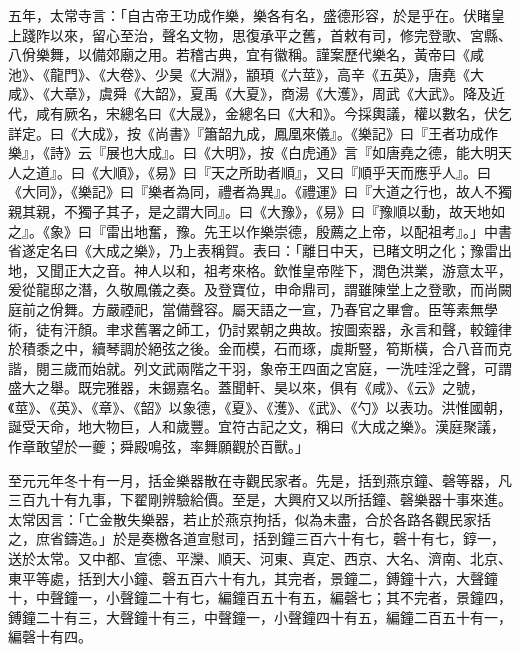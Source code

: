 \begin{pinyinscope}
 五年，太常寺言：「自古帝王功成作樂，樂各有名，盛德形容，於是乎在。伏睹皇上踐阼以來，留心至治，聲名文物，思復承平之舊，首敕有司，修完登歌、宮縣、八佾樂舞，以備郊廟之用。若稽古典，宜有徽稱。謹案歷代樂名，黃帝曰《咸池》、《龍門》、《大卷》、少昊《大淵》，顓頊《六莖》，高辛《五英》，唐堯《大咸》、《大章》，虞舜《大韶》，夏禹《大夏》，商湯《大濩》，周武《大武》。降及近代，咸有厥名，宋總名曰《大晟》，金總名曰《大和》。今採輿議，權以數名，伏乞詳定。曰《大成》，按《尚書》『簫韶九成，鳳凰來儀』。《樂記》曰『王者功成作樂』，《詩》云『展也大成』。曰《大明》，按《白虎通》言『如唐堯之德，能大明天人之道』。曰《大順》，《易》曰『天之所助者順』，又曰『順乎天而應乎人』。曰《大同》，《樂記》曰『樂者為同，禮者為異』。《禮運》曰『大道之行也，故人不獨親其親，不獨子其子，是之謂大同』。曰《大豫》，《易》曰『豫順以動，故天地如之』。《象》曰『雷出地奮，豫。先王以作樂崇德，殷薦之上帝，以配祖考』。」中書省遂定名曰《大成之樂》，乃上表稱賀。表曰：「離日中天，已睹文明之化；豫雷出地，又聞正大之音。神人以和，祖考來格。欽惟皇帝陛下，潤色洪業，游意太平，爰從龍邸之潛，久敬鳳儀之奏。及登寶位，申命鼎司，謂雖陳堂上之登歌，而尚闕庭前之佾舞。方嚴禋祀，當備聲容。屬天語之一宣，乃春官之畢會。臣等素無學術，徒有汗顏。聿求舊署之師工，仍討累朝之典故。按圖索器，永言和聲，較鐘律於積黍之中，續琴調於絕弦之後。金而模，石而琢，虡斯豎，筍斯橫，合八音而克諧，閱三歲而始就。列文武兩階之干羽，象帝王四面之宮庭，一洗哇淫之聲，可謂盛大之舉。既完雅器，未錫嘉名。蓋聞軒、昊以來，俱有《咸》、《云》之號，《莖》、《英》、《章》、《韶》以象德，《夏》、《濩》、《武》、《勺》以表功。洪惟國朝，誕受天命，地大物巨，人和歲豐。宜符古記之文，稱曰《大成之樂》。漢庭聚議，作章敢望於一夔；舜殿鳴弦，率舞願觀於百獸。」



 至元元年冬十有一月，括金樂器散在寺觀民家者。先是，括到燕京鐘、磬等器，凡三百九十有九事，下翟剛辨驗給價。至是，大興府又以所括鐘、磬樂器十事來進。太常因言：「亡金散失樂器，若止於燕京拘括，似為未盡，合於各路各觀民家括之，庶省鑄造。」於是奏檄各道宣慰司，括到鐘三百六十有七，磬十有七，錞一，送於太常。又中都、宣德、平灤、順天、河東、真定、西京、大名、濟南、北京、東平等處，括到大小鐘、磬五百六十有九，其完者，景鐘二，鎛鐘十六，大聲鐘十，中聲鐘一，小聲鐘二十有七，編鐘百五十有五，編磬七；其不完者，景鐘四，鎛鐘二十有三，大聲鐘十有三，中聲鐘一，小聲鐘四十有五，編鐘二百五十有一，編磬十有四。




\end{pinyinscope}
